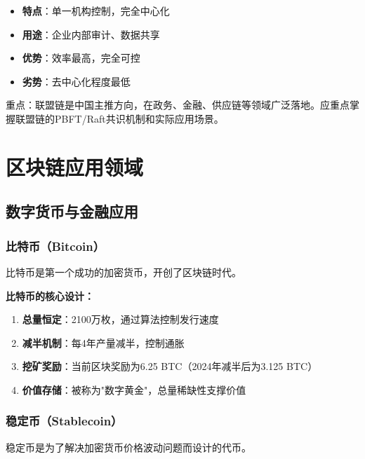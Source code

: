 ﻿\documentclass[12pt,a4paper]{article}
\begin{document}
\begin{itemize}[leftmargin=1.5em]
\item \textbf{特点}：单一机构控制，完全中心化
\item \textbf{用途}：企业内部审计、数据共享
\item \textbf{优势}：效率最高，完全可控
\item \textbf{劣势}：去中心化程度最低
\end{itemize}

\begin{keypointbox}
重点：联盟链是中国主推方向，在政务、金融、供应链等领域广泛落地。应重点掌握联盟链的PBFT/Raft共识机制和实际应用场景。
\end{keypointbox}

\section{区块链应用领域}

\subsection{数字货币与金融应用}

\subsubsection{比特币（Bitcoin）}

比特币是第一个成功的加密货币，开创了区块链时代。

\begin{theorybox}
\textbf{比特币的核心设计：}
\begin{enumerate}
\item \textbf{总量恒定}：2100万枚，通过算法控制发行速度
\item \textbf{减半机制}：每4年产量减半，控制通胀
\item \textbf{挖矿奖励}：当前区块奖励为6.25 BTC（2024年减半后为3.125 BTC）
\item \textbf{价值存储}：被称为"数字黄金"，总量稀缺性支撑价值
\end{enumerate}
\end{theorybox}

\subsubsection{稳定币（Stablecoin）}

稳定币是为了解决加密货币价格波动问题而设计的代币。
\end{document}

